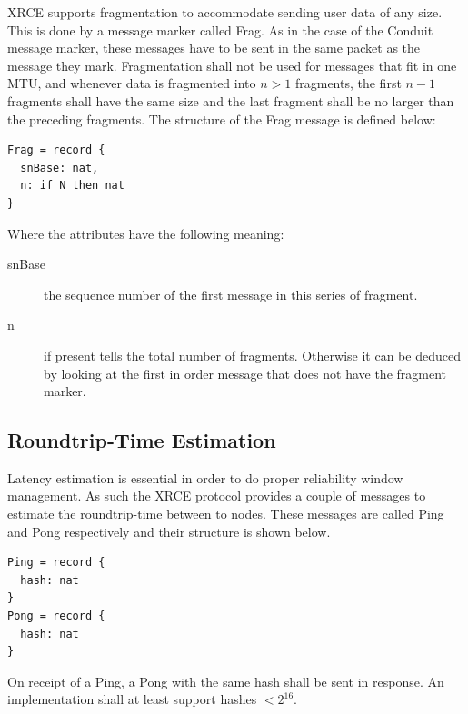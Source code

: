 \documentclass[a4paper,oneside,article]{memoir}
\begin{document}
XRCE supports fragmentation to accommodate sending user data of any size.  This is done by a message
marker called Frag.  As in the case of the Conduit message marker, these messages have to be sent in
the same packet as the message they mark.  Fragmentation shall not be used for messages that fit in
one MTU, and whenever data is fragmented into $n > 1$ fragments, the first $n - 1$ fragments shall
have the same size and the last fragment shall be no larger than the preceding fragments.  The
structure of the Frag message is defined below:
\begin{verbatim}
Frag = record {
  snBase: nat,
  n: if N then nat
}
\end{verbatim}
Where the attributes have the following meaning:
\begin{description}
\item[snBase] the sequence number of the first message in this series of fragment.
\item[n] if present tells the total number of fragments. Otherwise it can be deduced by looking at
  the first in order message that does not have the fragment marker.
\end{description}

\subsection{Roundtrip-Time Estimation}

Latency estimation is essential in order to do proper reliability window management.  As such the
XRCE protocol provides a couple of messages to estimate the roundtrip-time between to nodes.  These
messages are called Ping and Pong respectively and their structure is shown below.
\begin{verbatim}
Ping = record {
  hash: nat
}
Pong = record {
  hash: nat
}
\end{verbatim}
On receipt of a Ping, a Pong with the same hash shall be sent in response.  An implementation shall
at least support hashes $< 2^{16}$.
\end{document}
